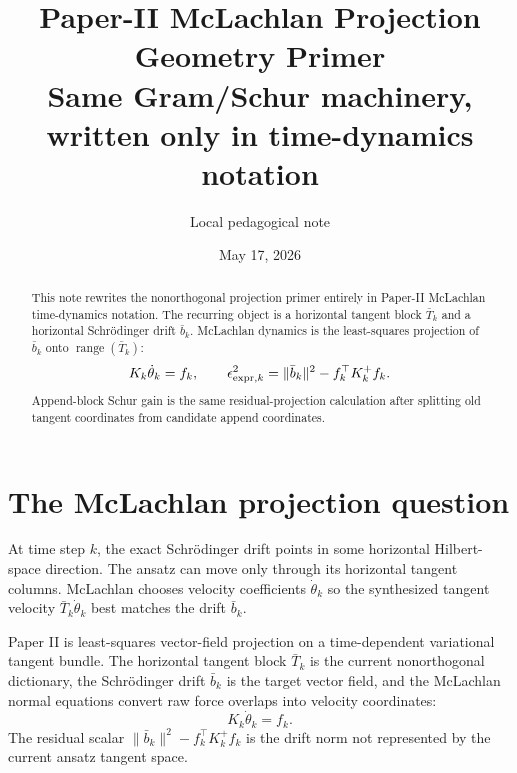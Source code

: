 \documentclass[10pt,twocolumn]{article}
\title{Paper-II McLachlan Projection Geometry Primer\\[-1mm]
\large Same Gram/Schur machinery, written only in time-dynamics notation}
\author{Local pedagogical note}
\date{May 17, 2026}
\newcommand{\range}{\operatorname{range}}
\begin{document}
\maketitle

\begin{abstract}
This note rewrites the nonorthogonal projection primer entirely in Paper-II McLachlan time-dynamics notation. The recurring object is a horizontal tangent block \(\bar T_k\) and a horizontal Schr\"odinger drift \(\bar b_k\). McLachlan dynamics is the least-squares projection of \(\bar b_k\) onto \(\range(\bar T_k)\):
\[
K_k\dot\theta_k=f_k,
\qquad
\epsilon_{{\rm expr},k}^2=\|\bar b_k\|^2-f_k^\top K_k^+f_k.
\]
Append-block Schur gain is the same residual-projection calculation after splitting old tangent coordinates from candidate append coordinates.
\end{abstract}

\section{The McLachlan projection question}

\begin{intuitionbox}
At time step \(k\), the exact Schr\"odinger drift points in some horizontal Hilbert-space direction. The ansatz can move only through its horizontal tangent columns. McLachlan chooses velocity coefficients \(\dot\theta_k\) so the synthesized tangent velocity \(\bar T_k\dot\theta_k\) best matches the drift \(\bar b_k\).
\end{intuitionbox}

\begin{jargonbox}
Paper II is least-squares vector-field projection on a time-dependent variational tangent bundle. The horizontal tangent block \(\bar T_k\) is the current nonorthogonal dictionary, the Schr\"odinger drift \(\bar b_k\) is the target vector field, and the McLachlan normal equations convert raw force overlaps into velocity coordinates:
\[
K_k\dot\theta_k=f_k.
\]
The residual scalar \(\|\bar b_k\|^2-f_k^\top K_k^+f_k\) is the drift norm not represented by the current ansatz tangent space.
\end{jargonbox}
\end{document}
